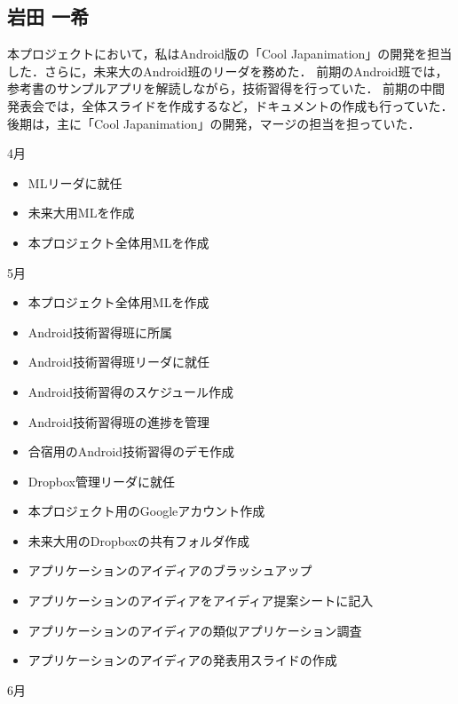 \subsection{岩田 一希}
\par
本プロジェクトにおいて，私はAndroid版の「Cool Japanimation」の開発を担当した．さらに，未来大のAndroid班のリーダを務めた．
前期のAndroid班では，参考書のサンプルアプリを解読しながら，技術習得を行っていた．
前期の中間発表会では，全体スライドを作成するなど，ドキュメントの作成も行っていた．
後期は，主に「Cool Japanimation」の開発，マージの担当を担っていた．
\par

4月
\begin{itemize}
\item MLリーダに就任
\item 未来大用MLを作成
\item 本プロジェクト全体用MLを作成
\end{itemize}
5月
\begin{itemize}
\item 本プロジェクト全体用MLを作成
\item Android技術習得班に所属
\item Android技術習得班リーダに就任
\item Android技術習得のスケジュール作成
\item Android技術習得班の進捗を管理
\item 合宿用のAndroid技術習得のデモ作成
\item Dropbox管理リーダに就任
\item 本プロジェクト用のGoogleアカウント作成
\item 未来大用のDropboxの共有フォルダ作成
\item アプリケーションのアイディアのブラッシュアップ
\item アプリケーションのアイディアをアイディア提案シートに記入
\item アプリケーションのアイディアの類似アプリケーション調査
\item アプリケーションのアイディアの発表用スライドの作成
\end{itemize}
6月
